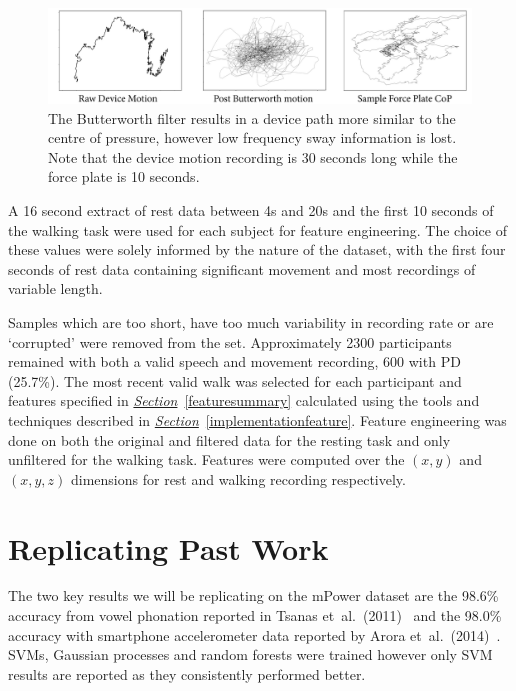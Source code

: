 \documentclass[12pt, twoside]{book}
\begin{document}
\begin{figure}[h]
	\label{butterworth}
	\centering\centerline{\includegraphics[width=1.2\linewidth]{butterworth.png}}
	\caption{The Butterworth filter results in a device path more similar to the centre of pressure, however low frequency sway information is lost. Note that the device motion recording is 30 seconds long while the force plate is 10 seconds.}
\end{figure}

A 16 second extract of rest data between 4s and 20s and the first 10 seconds of the walking task were used for each subject for feature engineering. The choice of these values were solely informed by the nature of the dataset, with the first four seconds of rest data containing significant movement and most recordings of variable length.

Samples which are too short, have too much variability in recording rate or are `corrupted' were removed from the set. Approximately 2300 participants remained with both a valid speech and movement recording, 600 with PD (25.7\%). The most recent valid walk was selected for each participant and features specified in \textit{\hyperref[featuresummary]{Section}}~\ref{featuresummary} calculated using the tools and techniques described in \textit{\hyperref[implementationfeature]{Section}}~\ref{implementationfeature}.  Feature engineering was done on both the original and filtered data for the resting task and only unfiltered for the walking task. Features were computed over the $(x,y)$ and $(x,y,z)$ dimensions for rest and walking recording respectively.


\section{Replicating Past Work}
\label{pastwork}
The two key results we will be replicating on the mPower dataset are the 98.6\% accuracy from vowel phonation reported in Tsanas et~al.~(2011)~\cite{tsanas2012novel} and the 98.0\% accuracy with smartphone accelerometer data reported by Arora et~al.~(2014)~\cite{arora2014high}. SVMs, Gaussian processes and random forests were trained however only SVM results are reported as they consistently performed better.
\end{document}
